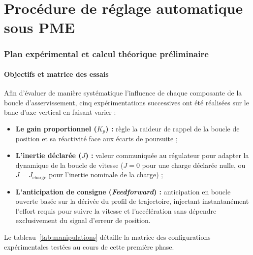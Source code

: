 \documentclass[12pt,a4paper]{article}
\begin{document}
\clearpage
{}

\tableofcontents
\clearpage

\part{Procédure de réglage automatique sous PME}

\section{Plan expérimental et calcul théorique préliminaire}
\label{sec:plan_exp}

\subsection{Objectifs et matrice des essais}

Afin d'évaluer de manière systématique l'influence de chaque composante de la boucle d'asservissement, cinq expérimentations successives ont été réalisées sur le banc d'axe vertical en faisant varier :
\begin{itemize}
    \item \textbf{Le gain proportionnel ($K_p$) :} règle la raideur de rappel de la boucle de position et sa réactivité face aux écarts de poursuite ;
    \item \textbf{L'inertie déclarée ($J$) :} valeur communiquée au régulateur pour adapter la dynamique de la boucle de vitesse ($J = 0$ pour une charge déclarée nulle, ou $J = J_{\text{charge}}$ pour l'inertie nominale de la charge) ;
    \item \textbf{L'anticipation de consigne (\textit{Feedforward}) :} anticipation en boucle ouverte basée sur la dérivée du profil de trajectoire, injectant instantanément l'effort requis pour suivre la vitesse et l'accélération sans dépendre exclusivement du signal d'erreur de position.
\end{itemize}

Le tableau~\ref{tab:manipulations} détaille la matrice des configurations expérimentales testées au cours de cette première phase.
\end{document}
